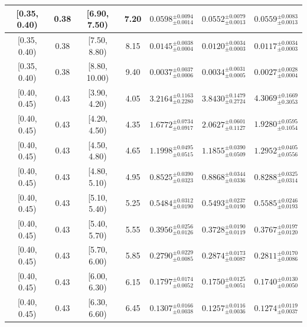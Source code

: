 \begin{longtable}{|c|c|c|c|c|c|c|}
\hline
[0.35, 0.40) & 0.38 & [6.90, 7.50) & 7.20 & $0.0598^{ \pm 0.0094 }_{ \pm 0.0014 }$ & $0.0552^{ \pm 0.0079 }_{ \pm 0.0013 }$ & $0.0559^{ \pm 0.0083 }_{ \pm 0.0013 }$ \\ 
\hline
[0.35, 0.40) & 0.38 & [7.50, 8.80) & 8.15 & $0.0145^{ \pm 0.0038 }_{ \pm 0.0004 }$ & $0.0120^{ \pm 0.0034 }_{ \pm 0.0003 }$ & $0.0117^{ \pm 0.0034 }_{ \pm 0.0003 }$ \\ 
\hline
[0.35, 0.40) & 0.38 & [8.80, 10.00) & 9.40 & $0.0037^{ \pm 0.0037 }_{ \pm 0.0006 }$ & $0.0034^{ \pm 0.0031 }_{ \pm 0.0005 }$ & $0.0027^{ \pm 0.0028 }_{ \pm 0.0004 }$ \\ 
\hline
[0.40, 0.45) & 0.43 & [3.90, 4.20) & 4.05 & $3.2164^{ \pm 0.1163 }_{ \pm 0.2280 }$ & $3.8430^{ \pm 0.1479 }_{ \pm 0.2724 }$ & $4.3069^{ \pm 0.1669 }_{ \pm 0.3053 }$ \\ 
\hline
[0.40, 0.45) & 0.43 & [4.20, 4.50) & 4.35 & $1.6772^{ \pm 0.0734 }_{ \pm 0.0917 }$ & $2.0627^{ \pm 0.0601 }_{ \pm 0.1127 }$ & $1.9280^{ \pm 0.0595 }_{ \pm 0.1054 }$ \\ 
\hline
[0.40, 0.45) & 0.43 & [4.50, 4.80) & 4.65 & $1.1998^{ \pm 0.0495 }_{ \pm 0.0515 }$ & $1.1855^{ \pm 0.0390 }_{ \pm 0.0509 }$ & $1.2952^{ \pm 0.0405 }_{ \pm 0.0556 }$ \\ 
\hline
[0.40, 0.45) & 0.43 & [4.80, 5.10) & 4.95 & $0.8525^{ \pm 0.0390 }_{ \pm 0.0323 }$ & $0.8868^{ \pm 0.0344 }_{ \pm 0.0336 }$ & $0.8288^{ \pm 0.0325 }_{ \pm 0.0314 }$ \\ 
\hline
[0.40, 0.45) & 0.43 & [5.10, 5.40) & 5.25 & $0.5484^{ \pm 0.0312 }_{ \pm 0.0190 }$ & $0.5493^{ \pm 0.0237 }_{ \pm 0.0190 }$ & $0.5585^{ \pm 0.0246 }_{ \pm 0.0193 }$ \\ 
\hline
[0.40, 0.45) & 0.43 & [5.40, 5.70) & 5.55 & $0.3956^{ \pm 0.0256 }_{ \pm 0.0126 }$ & $0.3728^{ \pm 0.0190 }_{ \pm 0.0119 }$ & $0.3767^{ \pm 0.0197 }_{ \pm 0.0120 }$ \\ 
\hline
[0.40, 0.45) & 0.43 & [5.70, 6.00) & 5.85 & $0.2790^{ \pm 0.0229 }_{ \pm 0.0085 }$ & $0.2874^{ \pm 0.0173 }_{ \pm 0.0087 }$ & $0.2811^{ \pm 0.0170 }_{ \pm 0.0086 }$ \\ 
\hline
[0.40, 0.45) & 0.43 & [6.00, 6.30) & 6.15 & $0.1797^{ \pm 0.0174 }_{ \pm 0.0052 }$ & $0.1750^{ \pm 0.0125 }_{ \pm 0.0051 }$ & $0.1740^{ \pm 0.0130 }_{ \pm 0.0050 }$ \\ 
\hline
[0.40, 0.45) & 0.43 & [6.30, 6.60) & 6.45 & $0.1307^{ \pm 0.0166 }_{ \pm 0.0038 }$ & $0.1257^{ \pm 0.0116 }_{ \pm 0.0036 }$ & $0.1274^{ \pm 0.0119 }_{ \pm 0.0037 }$ \\ 
\hline

\end{longtable}
